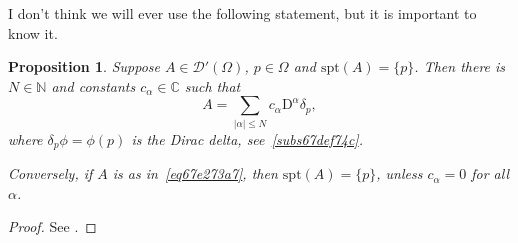\documentclass[a4paper,9pt]{amsart}
\newcommand{\scr}[1]{\mathscr{#1}}
\newcommand{\N}{\mathbb{N}}	%
\newcommand{\C}{\mathbb{C}}	%
\newcommand{\Diff}{\mathrm{D}}
\newcommand{\spt}{\mathrm{spt}}
\theoremstyle{plain}
\newtheorem{proposition}{Proposition}[section]
\theoremstyle{definition}
\theoremstyle{remark}
\begin{document}
I don't think we will ever use the following statement, but it is important to know it.

\begin{proposition}\label{prop67fe6632}
	Suppose $A\in\scr D'(\Omega)$, $p\in\Omega$ and $\spt(A) = \{p\}$.
	Then there is $N\in\N$ and constants $c_\alpha\in\C$ such that
	\begin{equation}\label{eq67e273a7}
		A = \sum_{|\alpha|\le N} c_\alpha \Diff^\alpha \delta_p ,
	\end{equation}
	where $\delta_p\phi=\phi(p)$ is the Dirac delta, see~\ref{subs67def74c}.
	
	Conversely, if $A$ is as in~\eqref{eq67e273a7}, then $\spt(A)=\{p\}$, unless $c_\alpha=0$ for all $\alpha$.
\end{proposition}
\begin{proof}
	See \cite[Thm.6.21]{MR1157815}.
\end{proof}
%
%	
%	
\end{document}
